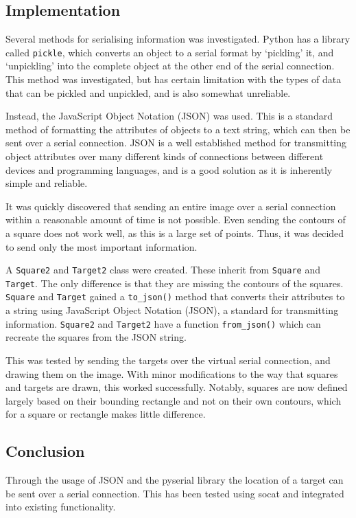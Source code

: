 \documentclass[11pt]{article}
\begin{document}
\subsection{Implementation}
Several methods for serialising information was investigated. Python has a library called \lstinline|pickle|, which converts an object to a serial format by `pickling' it, and `unpickling' into the complete object at the other end of the serial connection. This method was investigated, but has certain limitation with the types of data that can be pickled and unpickled, and is also somewhat unreliable.

Instead, the JavaScript Object Notation (JSON) was used. This is a standard method of formatting the attributes of objects to a text string, which can then be sent over a serial connection. JSON is a well established method for transmitting object attributes over many different kinds of connections between different devices and programming languages, and is a good solution as it is inherently simple and reliable.

It was quickly discovered that sending an entire image over a serial connection within a reasonable amount of time is not possible. Even sending the contours of a square does not work well, as this is a large set of points. Thus, it was decided to send only the most important information.

A \lstinline|Square2| and \lstinline|Target2| class were created. These inherit from \lstinline|Square| and \lstinline|Target|. The only difference is that they are missing the contours of the squares. \lstinline|Square| and \lstinline|Target| gained a \lstinline|to_json()| method that converts their attributes to a string using JavaScript Object Notation (JSON), a standard for transmitting information. \lstinline|Square2| and \lstinline|Target2| have a function \lstinline|from_json()| which can recreate the squares from the JSON string.

This was tested by sending the targets over the virtual serial connection, and drawing them on the image. With minor modifications to the way that squares and targets are drawn, this worked successfully. Notably, squares are now defined largely based on their bounding rectangle and not on their own contours, which for a square or rectangle makes little difference.

\subsection{Conclusion}
Through the usage of JSON and the pyserial library the location of a target can be sent over a serial connection. This has been tested using socat and integrated into existing functionality.
\end{document}
